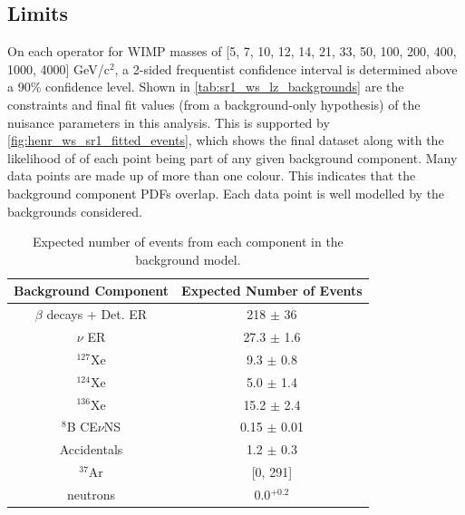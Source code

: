 
\subsection{Limits}
\par
On each operator for WIMP masses of [5, 7, 10, 12, 14, 21, 33, 50, 100, 200, 400, 1000, 4000] GeV/c$^2$, a 2-sided frequentist confidence interval is determined above a 90\% confidence level.
Shown in \autoref{tab:sr1_ws_lz_backgrounds} are the constraints and final fit values (from a background-only hypothesis) of the nuisance parameters in this analysis.
This is supported by \autoref{fig:henr_ws_sr1_fitted_events}, which shows the final dataset along with the likelihood of of each point being part of any given background component.
Many data points are made up of more than one colour.
This indicates that the background component PDFs overlap.
Each data point is well modelled by the backgrounds considered.


\begin{table}[]
    \centering
    \begin{tabular}{c|c}
        Background Component     & Expected Number of Events  \\ \hline
        $\beta$ decays + Det. ER & 218 $\pm$ 36 \\
        $\nu$ ER                 & 27.3 $\pm$ 1.6 \\
        ${}^{127}$Xe             & 9.3 $\pm$ 0.8 \\
        ${}^{124}$Xe             & 5.0 $\pm$ 1.4 \\
        ${}^{136}$Xe             & 15.2 $\pm$ 2.4 \\
        ${}^{8}$B CE$\nu$NS      & 0.15 $\pm$ 0.01 \\
        Accidentals              & 1.2 $\pm$ 0.3 \\
        ${}^{37}$Ar              & [0, 291]      \\
        neutrons                 & 0.0${}^{+0.2}$
    \end{tabular}
    \caption{Expected number of events from each component in the background model.}
    \label{tab:sr1_ws_lz_backgrounds}
\end{table}

